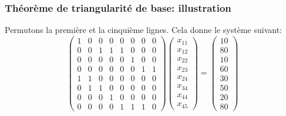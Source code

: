 \documentclass[usepdftitle=false]{beamer}
\begin{document}
\begin{frame}
\frametitle{Théorème de triangularité de base: illustration}

Permutons la première et la cinquième lignes.
Cela donne le système suivant:
\[
\begin{pmatrix}
 1 & 0 & 0 & 0 & 0 & 0 & 0 & 0 \\
 0 & 0 & 1 & 1 & 1 & 0 & 0 & 0 \\
 0 & 0 & 0 & 0 & 0 & 1 & 0 & 0 \\
 0 & 0 & 0 & 0 & 0 & 0 & 1 & 1 \\
 1 & 1 & 0 & 0 & 0 & 0 & 0 & 0 \\
 0 & 1 & 1 & 0 & 0 & 0 & 0 & 0 \\
 0 & 0 & 0 & 1 & 0 & 0 & 0 & 0 \\
 0 & 0 & 0 & 0 & 1 & 1 & 1 & 0
\end{pmatrix}
\begin{pmatrix}
x_{11} \\
x_{12} \\
x_{22} \\
x_{23} \\
x_{24} \\
x_{34} \\
x_{44} \\
x_{45}
\end{pmatrix}
=
\begin{pmatrix}
10 \\
80 \\
10 \\
60 \\
30 \\
50 \\
20 \\
80
\end{pmatrix}
\]

\end{frame}
\end{document}
